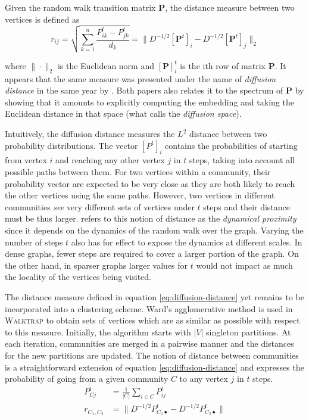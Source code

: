 Given the random walk transition matrix $\mathbf{P}$, the distance
measure between two vertices is defined as 
\begin{equation}
r_{ij} = \sqrt{\sum_{k=1}^n \frac{P_{ik}^t - P_{jk}^t}{d_k}} = \| D^{-1/2}
[\mathbf{P}^t]_i - D^{-1/2} [\mathbf{P}^t]_j \|_2
\label{eq:diffusion-distance}
\end{equation}

where $\| \cdot \|_2$ is the Euclidean norm and $[\mathbf{P}]^t_i$ is the
ith row of matrix $\mathbf{P}$. It appears that the same measure was
presented under the name of \textit{diffusion distance} in the same year
by \cite{Nadler2005}. Both papers also relates it to the spectrum of $\mathbf{P}$ by
showing that it amounts to explicitly computing the embedding and taking the Euclidean
distance in that space (what \cite{Nadler2005} calls the \textit{diffusion space}).
 
Intuitively, the diffusion distance measures the $L^2$ distance between two probability
distributions. The vector $[P^t]_i$ contains the probabilities of starting from vertex $i$
and reaching any other vertex $j$ in $t$ steps, taking into account all possible paths 
between them. For two vertices within a community, their probability vector are
expected to be very close as they are both likely to reach the other vertices using the
same paths. However, two vertices in different communities \textit{see} very different
sets of vertices under $t$ steps and their distance must be thus larger. \cite{Nadler2005} refers to this notion of distance as the \textit{dynamical proximity} since it depends on the dynamics of the random walk over the graph. Varying the number of steps $t$ also has for effect to expose the dynamics at different scales. In dense graphs, fewer steps are required to cover a larger portion of the graph. On the other hand, in sparser graphs larger values for $t$ would not impact as much the locality of the vertices being visited. 

The distance measure defined in equation \ref{eq:diffusion-distance} yet remains to be incorporated into a clustering scheme. Ward's agglomerative method \parencite{Ward1963} is used in \textsc{Walktrap} to obtain sets of vertices which are as similar as possible with respect to this measure. Initially, the algorithm starts with $|V|$ singleton partitions.  At each iteration, communities are merged in a pairwise manner and the distances for the new partitions are updated. The notion of distance between communities is a straightforward extension of equation \ref{eq:diffusion-distance} and expresses the probability of going from a given community $C$ to any vertex $j$ in $t$ steps.  \label{sec:walktrap}
\begin{align}
P^t_{Cj} &= \frac{1}{|C|} \sum_{i \in C} P^t_{ij} \\
r_{C_1, C_2} &= \| D^{-1/2} P_{C_1 \bullet}^t - D^{-1/2} P_{C_2 \bullet}^t\|
\end{align}

